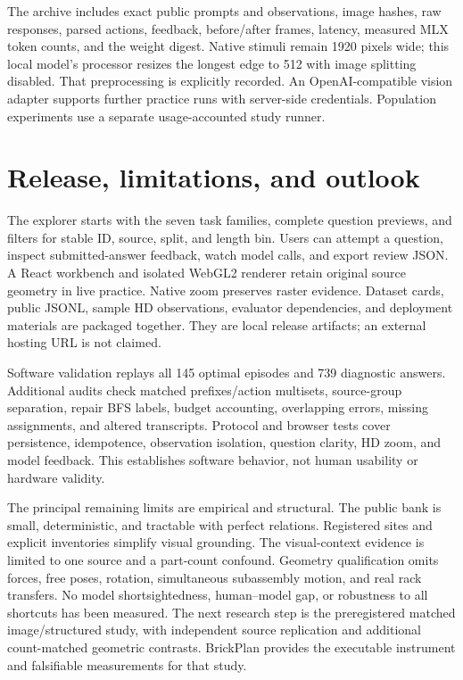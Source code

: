 \documentclass[10pt,twocolumn,letterpaper]{article}
\begin{document}
The archive includes exact public prompts and observations, image hashes,
raw responses, parsed actions, feedback, before/after frames, latency,
measured MLX token counts, and the weight digest. Native stimuli remain
1920 pixels wide; this local model's processor resizes the longest edge
to 512 with image splitting disabled. That preprocessing is explicitly
recorded. An OpenAI-compatible vision adapter supports further practice
runs with server-side credentials. Population experiments use a separate
usage-accounted study runner.

\section{Release, limitations, and outlook}
The explorer starts with the seven task families, complete question
previews, and filters for stable ID, source, split, and length bin.
Users can attempt a question, inspect submitted-answer feedback, watch
model calls, and export review JSON. A React workbench and isolated
WebGL2 renderer retain original source geometry in live practice.
Native zoom preserves raster evidence. Dataset cards, public JSONL,
sample HD observations, evaluator dependencies, and deployment materials
are packaged together. They are local release artifacts; an external
hosting URL is not claimed.

Software validation replays all 145 optimal episodes and 739 diagnostic
answers. Additional audits check matched prefixes/action multisets,
source-group separation, repair BFS labels, budget accounting, overlapping
errors, missing assignments, and altered transcripts. Protocol and
browser tests cover persistence, idempotence, observation isolation,
question clarity, HD zoom, and model feedback. This establishes software
behavior, not human usability or hardware validity.

The principal remaining limits are empirical and structural. The public
bank is small, deterministic, and tractable with perfect relations.
Registered sites and explicit inventories simplify visual grounding.
The visual-context evidence is limited to one source and a part-count
confound. Geometry qualification omits forces, free poses, rotation,
simultaneous subassembly motion, and real rack transfers. No model
shortsightedness, human--model gap, or robustness to all shortcuts has
been measured. The next research step is the preregistered matched
image/structured study, with independent source replication and
additional count-matched geometric contrasts. BrickPlan provides
the executable instrument and falsifiable measurements for that study.

{\small


}
\end{document}

